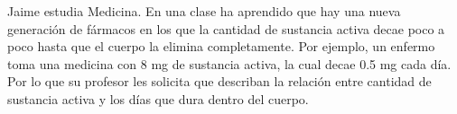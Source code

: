 \question Jaime estudia Medicina. En una clase ha aprendido que hay una nueva generación de fármacos en los que la cantidad de
sustancia activa decae poco a poco hasta que el cuerpo la elimina completamente. Por ejemplo, un enfermo toma una
medicina con 8 mg de sustancia activa, la cual decae 0.5 mg cada día. Por lo que su profesor les solicita que describan
la relación entre cantidad de sustancia activa y los días que dura dentro del cuerpo.

\begin{parts}
    \setlength{\columnsep}{30pt}
\end{parts}
